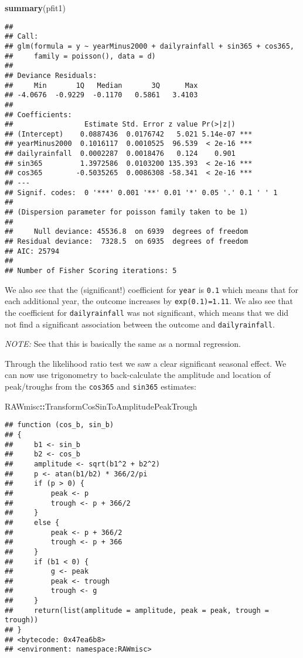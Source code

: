 \documentclass[]{book}
\newenvironment{Shaded}{\begin{snugshade}}{\end{snugshade}}
\newcommand{\KeywordTok}[1]{\textcolor[rgb]{0.13,0.29,0.53}{\textbf{#1}}}
\newcommand{\OperatorTok}[1]{\textcolor[rgb]{0.81,0.36,0.00}{\textbf{#1}}}
\newcommand{\NormalTok}[1]{#1}
\begin{document}
\begin{Shaded}
\begin{Highlighting}[]
\KeywordTok{summary}\NormalTok{(pfit1)}
\end{Highlighting}
\end{Shaded}

\begin{verbatim}
## 
## Call:
## glm(formula = y ~ yearMinus2000 + dailyrainfall + sin365 + cos365, 
##     family = poisson(), data = d)
## 
## Deviance Residuals: 
##     Min       1Q   Median       3Q      Max  
## -4.0676  -0.9229  -0.1170   0.5861   3.4103  
## 
## Coefficients:
##                 Estimate Std. Error z value Pr(>|z|)    
## (Intercept)    0.0887436  0.0176742   5.021 5.14e-07 ***
## yearMinus2000  0.1016117  0.0010525  96.539  < 2e-16 ***
## dailyrainfall  0.0002287  0.0018476   0.124    0.901    
## sin365         1.3972586  0.0103200 135.393  < 2e-16 ***
## cos365        -0.5035265  0.0086308 -58.341  < 2e-16 ***
## ---
## Signif. codes:  0 '***' 0.001 '**' 0.01 '*' 0.05 '.' 0.1 ' ' 1
## 
## (Dispersion parameter for poisson family taken to be 1)
## 
##     Null deviance: 45536.8  on 6939  degrees of freedom
## Residual deviance:  7328.5  on 6935  degrees of freedom
## AIC: 25794
## 
## Number of Fisher Scoring iterations: 5
\end{verbatim}

We also see that the (significant!) coefficient for \texttt{year} is
\texttt{0.1} which means that for each additional year, the outcome
increases by \texttt{exp(0.1)=1.11}. We also see that the coefficient
for \texttt{dailyrainfall} was not significant, which means that we did
not find a significant association between the outcome and
\texttt{dailyrainfall}.

\emph{NOTE:} See that this is basically the same as a normal regression.

Through the likelihood ratio test we saw a clear significant seasonal
effect. We can now use trigonometry to back-calculate the amplitude and
location of peak/troughs from the \texttt{cos365} and \texttt{sin365}
estimates:

\begin{Shaded}
\begin{Highlighting}[]
\NormalTok{RAWmisc}\OperatorTok{::}\NormalTok{TransformCosSinToAmplitudePeakTrough}
\end{Highlighting}
\end{Shaded}

\begin{verbatim}
## function (cos_b, sin_b) 
## {
##     b1 <- sin_b
##     b2 <- cos_b
##     amplitude <- sqrt(b1^2 + b2^2)
##     p <- atan(b1/b2) * 366/2/pi
##     if (p > 0) {
##         peak <- p
##         trough <- p + 366/2
##     }
##     else {
##         peak <- p + 366/2
##         trough <- p + 366
##     }
##     if (b1 < 0) {
##         g <- peak
##         peak <- trough
##         trough <- g
##     }
##     return(list(amplitude = amplitude, peak = peak, trough = trough))
## }
## <bytecode: 0x47ea6b8>
## <environment: namespace:RAWmisc>
\end{verbatim}
\end{document}
